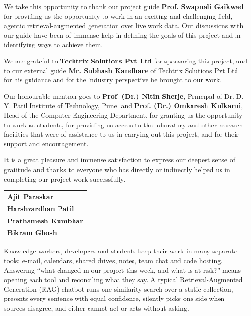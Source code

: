\documentclass[oneside,a4paper,12pt]{report}
\begin{document}
{
\vspace*{2\baselineskip}}
{\selectfont\linespread{1.5}\selectfont
We take this opportunity to thank our project guide \textbf{Prof. Swapnali Gaikwad} for providing us the
opportunity to work in an exciting and challenging field, agentic retrieval-augmented generation over live
work data. Our discussions with our guide have been of immense help in defining the goals of this project
and in identifying ways to achieve them.

\vspace{1em}
We are grateful to \textbf{Techtrix Solutions Pvt Ltd} for sponsoring this project, and to our external guide
\textbf{Mr. Subhash Kandhare} of Techtrix Solutions Pvt Ltd for his guidance and for the industry perspective he
brought to our work.

\vspace{1em}
Our honourable mention goes to \textbf{Prof. (Dr.) Nitin Sherje}, Principal of Dr. D. Y. Patil Institute of
Technology, Pune, and \textbf{Prof. (Dr.) Omkaresh Kulkarni}, Head of the Computer Engineering Department,
for granting us the opportunity to work as students, for providing us access to the laboratory and other
research facilities that were of assistance to us in carrying out this project, and for their support and
encouragement.

\vspace{1em}
It is a great pleasure and immense satisfaction to express our deepest sense of gratitude and thanks to
everyone who has directly or indirectly helped us in completing our project work successfully.\par
\vspace{2\baselineskip}
\hfill\begin{tabular}{@{}l@{}}
\textbf{Ajit Paraskar}\\
\textbf{Harshvardhan Patil}\\
\textbf{Prathamesh Kumbhar}\\
\textbf{Bikram Ghosh}\\
\end{tabular}\par}

{   \setlength{\parindent}{11mm} }
{ \setlength{\parindent}{0mm} }
Knowledge workers, developers and students keep their work in many separate tools: e-mail, calendars, shared drives, notes, team chat and code hosting. Answering ``what changed in our project this week, and what is at risk?'' means opening each tool and reconciling what they say. A typical Retrieval-Augmented Generation (RAG) chatbot runs one similarity search over a static collection, presents every sentence with equal confidence, silently picks one side when sources disagree, and either cannot act or acts without asking.
\end{document}
